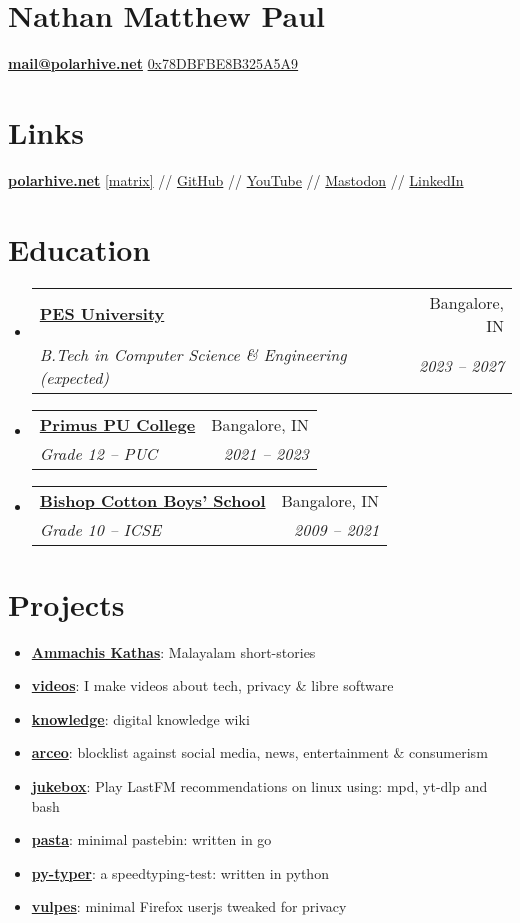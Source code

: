 \documentclass[letterpaper, 11pt]{article}
\makeatletter
\newcommand{\resumeItem}[2]{
  \item\small{
    \textbf{#1}{: #2 \vspace{-2pt}}
  }
}
\newcommand{\resumeSubheading}[4]{
 \vspace{-1pt}\item
 \begin{tabular*}{0.97\textwidth}[t]{l@{\extracolsep{\fill}}r}
   \textbf{#1} & #2 \\
  \textit{\small#3} & \textit{\small #4} \\
 \end{tabular*}\vspace{-5pt}
}
\newcommand{\resumeSubItem}[2]{\resumeItem{#1}{#2}\vspace{-4pt}}
\newcommand{\resumeSubHeadingListStart}{\begin{itemize}[leftmargin=*]}
\newcommand{\resumeSubHeadingListEnd}{\end{itemize}}
\makeatother
\begin{document}
\section{\Huge {\textbf {Nathan Matthew Paul}}}
{\textbf{\href{mailto:mail@polarhive.net}{mail@polarhive.net}}}
\newline
{\href{https://polarhive.net/.well-known/polarhive_gpg.txt}{0x78DBFBE8B325A5A9}}

\section{Links}
{\textbf{\href{https://polarhive.net}{polarhive.net}}
\newline
{\href{https://matrix.to/#/@polarhive:matrix.org}{[matrix]}} //
{\href{https://github.com/polarhive}{GitHub}} //
{\href{https://youtube.com/polarhive}{YouTube}} //
{\href{https://mastodon.social/@polarhive}{Mastodon}} //
{\href{https://www.linkedin.com/in/polarhive}{LinkedIn}}

\section{Education}
  \resumeSubHeadingListStart
    \resumeSubheading
      {\href{https://pes.edu}{PES University}}{Bangalore, IN}
      {B.Tech in Computer Science \& Engineering (expected)} {2023 -- 2027}
    \resumeSubheading
      {\href{https://primuspucollege.edu.in}{Primus PU College}}{Bangalore, IN}
      {Grade 12 -- PUC}{2021 -- 2023}
    \resumeSubheading
      {\href{https://en.wikipedia.org/wiki/Bishop_Cotton_Boys'_School}{Bishop Cotton Boys' School}}{Bangalore, IN}
      {Grade 10 -- ICSE}{2009 -- 2021}
\resumeSubHeadingListEnd

\section{Projects}
  \resumeSubHeadingListStart
    \resumeSubItem{\href{https://polarhive.net/ammachiskathas}{Ammachis Kathas}}
      {Malayalam short-stories}
    \resumeSubItem{\href{https://polarhive.net/videos}{videos}}
      {I make videos about tech, privacy \& libre software}
    \resumeSubItem{\href{https://polarhive.net/knowledge}{knowledge}}
      {digital knowledge wiki}
    \resumeSubItem{\href{https://polarhive.net/arceo}{arceo}}
      {blocklist against social media, news, entertainment \& consumerism}
    \resumeSubItem{\href{https://polarhive.net/jukebox}{jukebox}}
      {Play LastFM recommendations on linux using: mpd, yt-dlp and bash}
    \resumeSubItem{\href{https://polarhive.net/pasta}{pasta}}
      {minimal pastebin: written in go}
    \resumeSubItem{\href{https://polarhive.net/py-typer}{py-typer}}
      {a speedtyping-test: written in python}
    \resumeSubItem{\href{https://polarhive.net/vulpes}{vulpes}}
      {minimal Firefox userjs tweaked for privacy}
  \resumeSubHeadingListEnd

}
\end{document}
